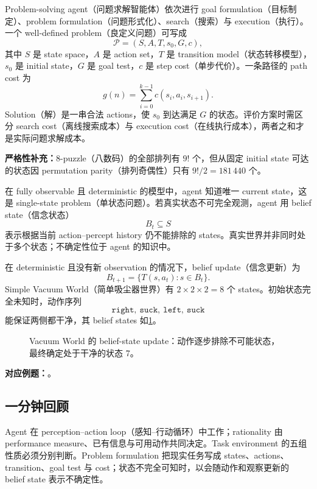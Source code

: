 
Problem-solving agent（问题求解智能体）依次进行 goal formulation（目标制定）、problem formulation（问题形式化）、search（搜索）与 execution（执行）。一个 well-defined problem（良定义问题）可写成
\[
  \boxed{\mathcal P=(S,A,T,s_0,G,c)},
\]
其中 $S$ 是 state space，$A$ 是 action set，$T$ 是 transition model（状态转移模型），$s_0$ 是 initial state，$G$ 是 goal test，$c$ 是 step cost（单步代价）。一条路径的 path cost 为
\[
  \boxed{g(n)=\sum_{i=0}^{k-1}c(s_i,a_i,s_{i+1})}.
\]
Solution（解）是一串合法 actions，使 $s_0$ 到达满足 $G$ 的状态。评价方案时需区分 search cost（离线搜索成本）与 execution cost（在线执行成本），两者之和才是实际问题求解成本。

\textbf{严格性补充：}8-puzzle（八数码）的全部排列有 $9!$ 个，但从固定 initial state 可达的状态因 permutation parity（排列奇偶性）只有 $9!/2=181\,440$ 个。


在 fully observable 且 deterministic 的模型中，agent 知道唯一 current state，这是 single-state problem（单状态问题）。若真实状态不可完全观测，agent 用 belief state（信念状态）
\[
  B_t\subseteq S
\]
表示根据当前 action--percept history 仍不能排除的 states。真实世界并非同时处于多个状态；不确定性位于 agent 的知识中。

在 deterministic 且没有新 observation 的情况下，belief update（信念更新）为
\[
  B_{t+1}=\{T(s,a_t):s\in B_t\}.
\]
Simple Vacuum World（简单吸尘器世界）有 $2\times2\times2=8$ 个 states。初始状态完全未知时，动作序列
\[
  \texttt{right},\ \texttt{suck},\ \texttt{left},\ \texttt{suck}
\]
能保证两侧都干净，其 belief states 如\cref{fig:sc3000-l01-belief-update}。

\begin{figure}[htbp]
  \centering
  \resizebox{0.97\textwidth}{!}{}
  \caption{Vacuum World 的 belief-state update：动作逐步排除不可能状态，最终确定处于干净的状态 7。}
  \label{fig:sc3000-l01-belief-update}
\end{figure}

\textbf{对应例题：}。

\subsection{一分钟回顾}

Agent 在 perception--action loop（感知--行动循环）中工作；rationality 由 performance measure、已有信息与可用动作共同决定。Task environment 的五组性质必须分别判断。Problem formulation 把现实任务写成 states、actions、transition、goal test 与 cost；状态不完全可知时，以会随动作和观察更新的 belief state 表示不确定性。

